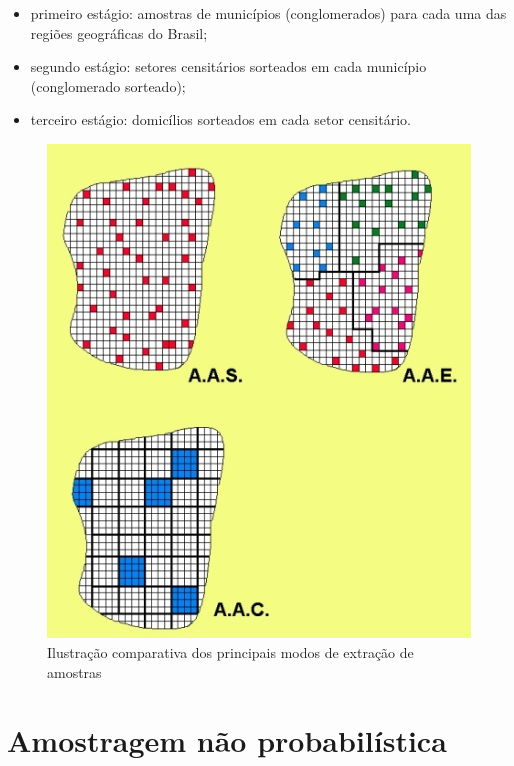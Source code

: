 \documentclass[
]{book}
\providecommand{\tightlist}{%
  \setlength{\itemsep}{0pt}\setlength{\parskip}{0pt}}
\begin{document}
\begin{itemize}
\tightlist
\item
  primeiro estágio: amostras de municípios (conglomerados) para cada uma das regiões geográficas do Brasil;\\
\item
  segundo estágio: setores censitários sorteados em cada município (conglomerado sorteado);\\
\item
  terceiro estágio: domicílios sorteados em cada setor censitário.
\end{itemize}

\hfill\break

\begin{figure}

{\centering \includegraphics[width=1\linewidth]{images7/simples_estratos_conglomerados} 

}

\caption{Ilustração comparativa dos principais modos de extração de amostras}\label{fig:fig08}
\end{figure}

\hypertarget{amostragem-nuxe3o-probabiluxedstica}{%
\section{Amostragem não probabilística}\label{amostragem-nuxe3o-probabiluxedstica}}
\end{document}
